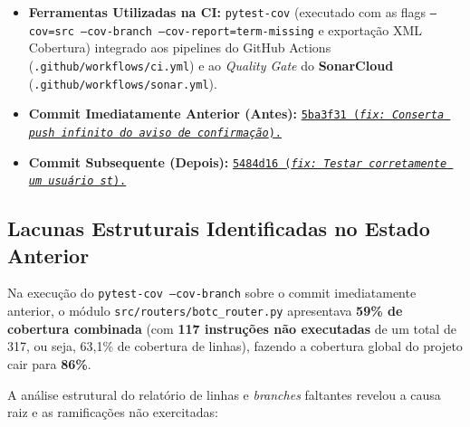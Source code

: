 \documentclass[12pt,a4paper]{article}
\begin{document}
\begin{itemize}[leftmargin=1.5em]
    \item \textbf{Ferramentas Utilizadas na CI:} \texttt{pytest-cov} (executado com as flags \texttt{--cov=src --cov-branch --cov-report=term-missing} e exportação XML Cobertura) integrado aos pipelines do GitHub Actions (\texttt{.github/workflows/ci.yml}) e ao \textit{Quality Gate} do \textbf{SonarCloud}\\ (\texttt{.github/workflows/sonar.yml}).
    \item \textbf{Commit Imediatamente Anterior (Antes):} \href{https://github.com/GiizAzul/MC656/commit/5ba3f31}{\texttt{5ba3f31 (\textit{fix: Conserta push infinito do aviso de confirmação}).}}
    \item \textbf{Commit Subsequente (Depois):} \href{https://github.com/GiizAzul/MC656/commit/5484d16}{\texttt{5484d16 (\textit{fix: Testar corretamente um usuário st}).}}
\end{itemize}

\subsection{Lacunas Estruturais Identificadas no Estado Anterior}
Na execução do \texttt{pytest-cov --cov-branch} sobre o commit imediatamente anterior, o módulo \texttt{src/routers/botc\_router.py} apresentava \textbf{59\% de cobertura combinada} (com \textbf{117 instruções não executadas} de um total de 317, ou seja, 63,1\% de cobertura de linhas), fazendo a cobertura global do projeto cair para \textbf{86\%}.

A análise estrutural do relatório de linhas e \textit{branches} faltantes revelou a causa raiz e as ramificações não exercitadas:
\end{document}
